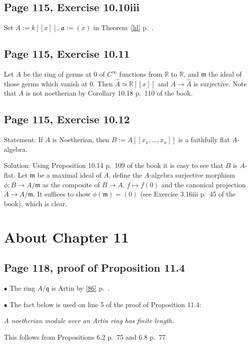 \documentclass[parskip=half,fontsize=12pt]{scrartcl}%
\newcommand{\mf}{\mathfrak}
\newcommand{\aaa}{\mf a}
\newcommand{\mmm}{\mf m}
\newcommand{\nnn}{\mf n}
\newcommand{\qqq}{\mf q}
\newcommand{\bu}{\bullet}
\begin{document}
\subsection{Page 115, Exercise 10.10iii}%

Set $A:=k[[x]]$, $\aaa:=(x)$ in Theorem~\ref{hl} p.~\pageref{hl}. 

\subsection{Page 115, Exercise 10.11}%

Let $A$ be the ring of germs at $0$ of $C^\infty$ functions from $\mathbb R$ to $\mathbb R$, and $\mmm$ the ideal of those germs which vanish at $0$. Then $\widehat A\simeq\mathbb R[[x]]$ and $A\to\widehat A$ is surjective. Note that $A$ is not noetherian by Corollary 10.18 p.~110 of the book. 

\subsection{Page 115, Exercise 10.12}%

Statement: If $A$ is Noetherian, then $B:=A[[x_1,\ldots,x_n]]$ is a faithfully flat $A$-algebra. 

Solution: Using Proposition 10.14 p.~109 of the book it is easy to see that $B$ is $A$-flat. Let $\mmm$ be a maximal ideal of $A$, define the $A$-algebra surjective morphism $\phi:B\to A/\mmm$ as the composite of $B\to A$, $f\mapsto f(0)$ and the canonical projection $A\to A/\mmm$. %
It suffices to show $\phi(\mmm)=(0)$ (see Exercise 3.16iii p.~45 of the book), which is clear. 

\section{About Chapter 11}%

\subsection{Page 118, proof of Proposition 11.4}%

$\bu$ The ring $A/\qqq$ is Artin by \eqref{86} p.~\pageref{86}.

$\bu$ The fact below is used on line 5 of the proof of Proposition 11.4:

\emph{A noetherian module over an Artin ring has finite length.}

This follows from Propositions 6.2 p.~75 and 6.8 p.~77.
\end{document}
